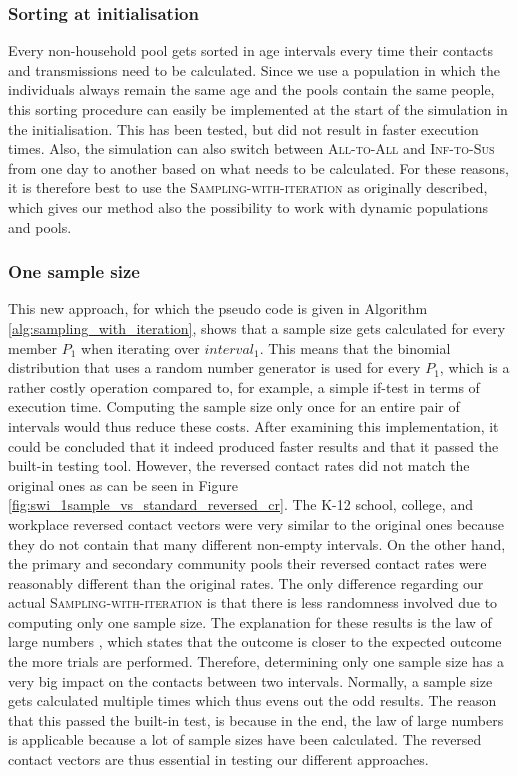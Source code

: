 \subsubsection{Sorting at initialisation}
Every non-household pool gets sorted in age intervals every time their contacts and transmissions need to be calculated. Since we use a population in which the individuals always remain the same age and the pools contain the same people, this sorting procedure can easily be implemented at the start of the simulation in the initialisation. This has been tested, but did not result in faster execution times. Also, the simulation can also switch between \textsc{All-to-All} and \textsc{Inf-to-Sus} from one day to another based on what needs to be calculated. For these reasons, it is therefore best to use the \textsc{Sampling-with-iteration} as originally described, which gives our method also the possibility to work with dynamic populations and pools.

\subsubsection{One sample size}
This new approach, for which the pseudo code is given in Algorithm \ref{alg:sampling_with_iteration}, shows that a sample size gets calculated for every member $P_{1}$ when iterating over $interval_{1}$. This means that the binomial distribution that uses a random number generator is used for every $P_{1}$, which is a rather costly operation compared to, for example, a simple if-test in terms of execution time. Computing the sample size only once for an entire pair of intervals would thus reduce these costs. After examining this implementation, it could be concluded that it indeed produced faster results and that it passed the built-in testing tool. However, the reversed contact rates did not match the original ones as can be seen in Figure \ref{fig:swi_1sample_vs_standard_reversed_cr}. The K-12 school, college, and workplace reversed contact vectors were very similar to the original ones because they do not contain that many different non-empty intervals. On the other hand, the primary and secondary community pools their reversed contact rates were reasonably different than the original rates. The only difference regarding our actual \textsc{Sampling-with-iteration} is that there is less randomness involved due to computing only one sample size. The explanation for these results is the law of large numbers \cite{law_large_numbers}, which states that the outcome is closer to the expected outcome the more trials are performed. Therefore, determining only one sample size has a very big impact on the contacts between two intervals. Normally, a sample size gets calculated multiple times which thus evens out the odd results. The reason that this passed the built-in test, is because in the end, the law of large numbers is applicable because a lot of sample sizes have been calculated. The reversed contact vectors are thus essential in testing our different approaches.

